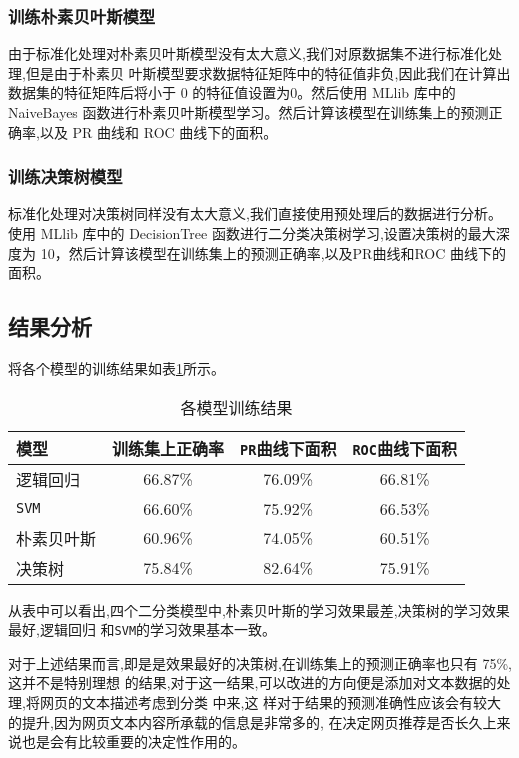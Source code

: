 \subsubsection{训练朴素贝叶斯模型}\label{ux8badux7ec3ux6734ux7d20ux8d1dux53f6ux65afux6a21ux578b}

由于标准化处理对朴素贝叶斯模型没有太大意义,我们对原数据集不进行标准化处理,但是由于朴素贝
叶斯模型要求数据特征矩阵中的特征值非负,因此我们在计算出数据集的特征矩阵后将小于
0 的特征值设置为0。然后使用 MLlib 库中的 NaiveBayes
函数进行朴素贝叶斯模型学习。然后计算该模型在训练集上的预测正确率,以及
PR 曲线和 ROC 曲线下的面积。

\subsubsection{训练决策树模型}\label{ux8badux7ec3ux51b3ux7b56ux6811ux6a21ux578b}

标准化处理对决策树同样没有太大意义,我们直接使用预处理后的数据进行分析。使用
MLlib 库中的 DecisionTree
函数进行二分类决策树学习,设置决策树的最大深度为
10，然后计算该模型在训练集上的预测正确率,以及PR曲线和ROC
曲线下的面积。

\subsection{结果分析}\label{ux7ed3ux679cux5206ux6790}

将各个模型的训练结果如表\ref{model-outcome}所示。

\begin{table}[!hbp]
	\centering
	\caption{各模型训练结果}
	\label{model-outcome}
	\begin{tabular}{lccc}
		\toprule
模型 &训练集上正确率 &\texttt{PR}曲线下面积 &\texttt{ROC}曲线下面积\\
\midrule
逻辑回归 & 66.87\% & 76.09\% &66.81\%\\
\texttt{SVM} &66.60\% &75.92\% & 66.53\%\\
朴素贝叶斯 &60.96\% & 74.05\% &60.51\%\\
决策树 &75.84\% &82.64\% & 75.91\%\\
\bottomrule
\end{tabular}
\end{table} 



从表中可以看出,四个二分类模型中,朴素贝叶斯的学习效果最差,决策树的学习效果最好,逻辑回归
和\texttt{SVM}的学习效果基本一致。

对于上述结果而言,即是是效果最好的决策树,在训练集上的预测正确率也只有
75\%,这并不是特别理想
的结果,对于这一结果,可以改进的方向便是添加对文本数据的处理,将网页的文本描述考虑到分类
中来,这
样对于结果的预测准确性应该会有较大的提升,因为网页文本内容所承载的信息是非常多的,
在决定网页推荐是否长久上来说也是会有比较重要的决定性作用的。

